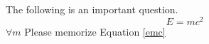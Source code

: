 \documentclass[a4paper,12pt]{report}
\begin{document}
	The following is an important question.
	\begin{equation}
	\label{emc}
	E=mc^2 
	\end{equation}
	 $\forall m$
Please memorize Equation \ref{emc}
\end{document}
